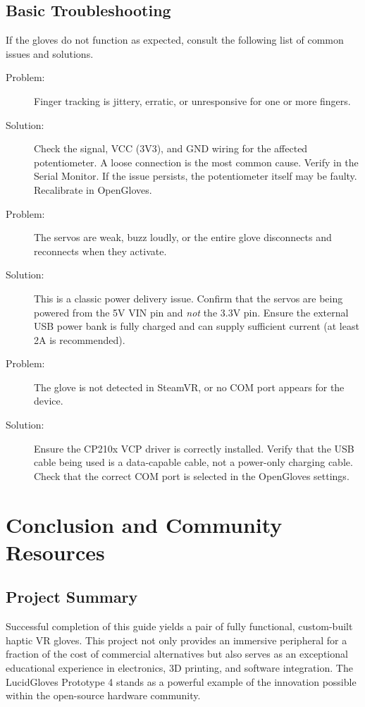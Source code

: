 \documentclass{article}
\begin{document}
\subsection{Basic Troubleshooting}
If the gloves do not function as expected, consult the following list of common issues and solutions.
\begin{description}
    \item[Problem:] Finger tracking is jittery, erratic, or unresponsive for one or more fingers.
    \item[Solution:] Check the signal, VCC (3V3), and GND wiring for the affected potentiometer. A loose connection is the most common cause. Verify in the Serial Monitor. If the issue persists, the potentiometer itself may be faulty. Recalibrate in OpenGloves.
    
    \item[Problem:] The servos are weak, buzz loudly, or the entire glove disconnects and reconnects when they activate.
    \item[Solution:] This is a classic power delivery issue. Confirm that the servos are being powered from the 5V VIN pin and \textit{not} the 3.3V pin. Ensure the external USB power bank is fully charged and can supply sufficient current (at least 2A is recommended).
    
    \item[Problem:] The glove is not detected in SteamVR, or no COM port appears for the device.
    \item[Solution:] Ensure the CP210x VCP driver is correctly installed. Verify that the USB cable being used is a data-capable cable, not a power-only charging cable. Check that the correct COM port is selected in the OpenGloves settings.
\end{description}

\newpage
\section{Conclusion and Community Resources}

\subsection{Project Summary}
Successful completion of this guide yields a pair of fully functional, custom-built haptic VR gloves. This project not only provides an immersive peripheral for a fraction of the cost of commercial alternatives but also serves as an exceptional educational experience in electronics, 3D printing, and software integration. The LucidGloves Prototype 4 stands as a powerful example of the innovation possible within the open-source hardware community.
\end{document}
